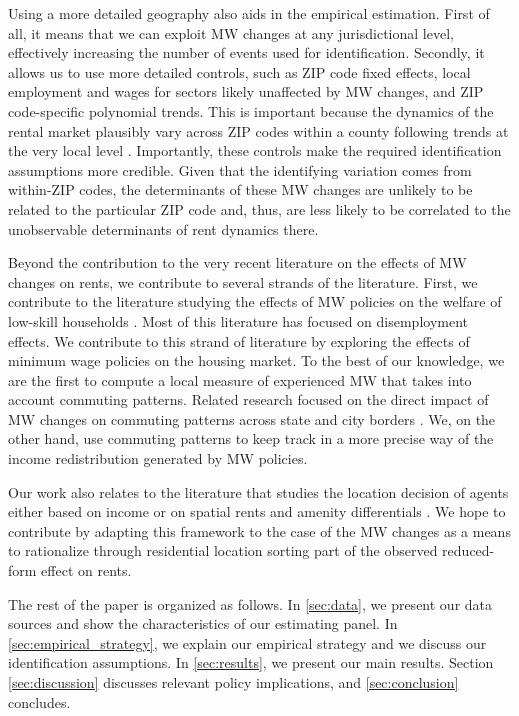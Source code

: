 Using a more detailed geography also aids in the empirical estimation. First of all, it means 
that we can exploit MW changes at any jurisdictional level, effectively increasing the number 
of events used for identification. Secondly, it allows us to use more detailed controls, such as 
ZIP code fixed effects, local employment and wages for sectors likely unaffected by MW changes, 
and ZIP code-specific polynomial trends. This is important because the dynamics of the rental 
market plausibly vary across ZIP codes within a county following trends at the very local level 
\parencite{AlmagroDominguez2019}. Importantly, these controls make the required identification 
assumptions more credible. Given that the identifying variation comes from within-ZIP codes, the 
determinants of these MW changes are unlikely to be related to the particular ZIP code and, thus, 
are less likely to be correlated to the unobservable determinants of rent dynamics there.

Beyond the contribution to the very recent literature on the effects of MW changes on rents, 
we contribute to several strands of the literature. First, we contribute to the literature 
studying the effects of MW policies on the welfare of low-skill households \parencite[][among 
others]{DinardoEtAl1995, Lee1999, CardKrueger2000, Neumark2006, AutorEtAl2016, CegnizEtAl2019}. 
Most of this literature has focused on disemployment effects. We contribute to this strand of 
literature by exploring the effects of minimum wage policies on the housing market. To the best 
of our knowledge, we are the first to compute a local measure of experienced MW that takes into 
account commuting patterns. Related research focused on the direct impact of MW changes on 
commuting patterns across state and city borders \parencite{Mckinnish2017, PerezPerez2018}. 
We, on the other hand, use commuting patterns to keep track in a more precise way of the 
income redistribution generated by MW policies.

Our work also relates to the literature that studies the location decision of agents either 
based on income \parencite{Roback1982, Kennan2011, DesmetRossihansberg2013, PerezPerez2018, 
Monras2019} or on spatial rents and amenity differentials \parencite{Diamond2016, 
AlmagroDominguez2019, Couture2019}. We hope to contribute by adapting this framework to the 
case of the MW changes as a means to rationalize through residential location sorting part of 
the observed reduced-form effect on rents.

The rest of the paper is organized as follows. In \autoref{sec:data}, we present our data 
sources and show the characteristics of our estimating panel. In 
\autoref{sec:empirical_strategy}, we explain our empirical strategy and we discuss our 
identification assumptions. In \autoref{sec:results}, we present our main results. Section 
\ref{sec:discussion} discusses relevant policy implications, and 
\autoref{sec:conclusion} concludes.
